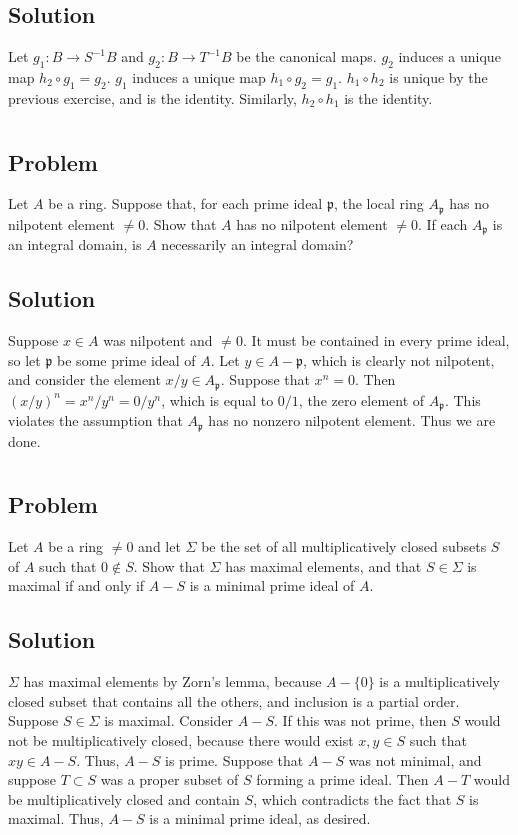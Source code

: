 \documentclass[book,12pt,oneside,openany]{memoir}
\begin{document}
\subsection{Solution}
Let $g_1:B\to S^{-1}B$ and $g_2:B\to T^{-1}B$ be the canonical maps.
$g_2$ induces a unique map $h_2\circ g_1=g_2$.
$g_1$ induces a unique map $h_1\circ g_2=g_1$.
$h_1\circ h_2$ is unique by the previous exercise, and is the identity.
Similarly, $h_2\circ h_1$ is the identity.
\section{}
\subsection{Problem}
Let $A$ be a ring. Suppose that, for each prime ideal $\mathfrak{p}$, the local ring $A_{\mathfrak{p}}$ has no nilpotent element $\neq 0$. Show that $A$ has no nilpotent element $\neq 0$. If each $A_{\mathfrak{p}}$ is an integral domain, is $A$ necessarily an integral domain?

\subsection{Solution}

Suppose $x \in A$ was nilpotent and $\neq 0$. It must be contained in every prime ideal, so let $\mathfrak{p}$ be some prime ideal of $A$. Let $y \in A - \mathfrak{p}$, which is clearly not nilpotent, and consider the element $x/y \in A_{\mathfrak{p}}$. Suppose that $x^n = 0$. Then $(x/y)^n = x^n/y^n = 0/y^n$, which is equal to $0/1$, the zero element of $A_{\mathfrak{p}}$. This violates the assumption that $A_{\mathfrak{p}}$ has no nonzero nilpotent element. Thus we are done.

\section{}
\subsection{Problem}
Let $A$ be a ring $\neq 0$ and let $\Sigma$ be the set of all multiplicatively closed subsets $S$ of $A$ such that $0 \notin S$. Show that $\Sigma$ has maximal elements, and that $S \in \Sigma$ is maximal if and only if $A -S$ is a minimal prime ideal of $A$.
\subsection{Solution}
$\Sigma$ has maximal elements by Zorn's lemma, because $A - \{0\}$ is a multiplicatively closed subset that contains all the others, and inclusion is a partial order. Suppose $S \in \Sigma$ is maximal. Consider $A - S$. If this was not prime, then $S$ would not be multiplicatively closed, because there would exist $x,y \in S$ such that $xy \in A - S$. Thus, $A-S$ is prime. Suppose that $A - S$ was not minimal, and suppose $T \subset S$ was a proper subset of $S$ forming a prime ideal. Then $A - T$ would be multiplicatively closed and contain $S$, which contradicts the fact that $S$ is maximal. Thus, $A-S$ is a minimal prime ideal, as desired.
\end{document}
